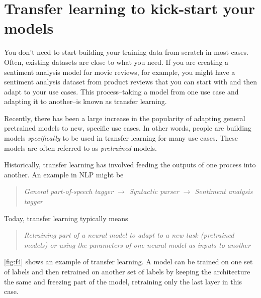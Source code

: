 \documentclass[sigconf,nonacm,screen,pbalance]{acmart}
\begin{document}
\section{Transfer learning to kick-start your models}
You
don't
need to start building your training data from scratch in most cases. Often, existing
datasets are close to what you need. If you are creating a sentiment analysis model for
movie reviews, for example, you might have a sentiment analysis dataset from product
reviews that you can start with and then adapt to your use cases. This process--taking a
model from one use case and adapting it to another--is known as transfer learning.

Recently,
there has been a large increase in the popularity of adapting general pretrained models
to new, specific use cases. In other words, people are building models
\emph{specifically} to be used in transfer learning for many use cases. These models are
often referred to as {\em pretrained} models.

Historically,
transfer learning has involved feeding the outputs of one process into another. An
example in NLP might be
\begin{quote}
{\em General part-of-speech tagger $\rightarrow$ Syntactic parser $\rightarrow$ Sentiment analysis tagger}
\end{quote}

Today, transfer learning typically means
\begin{quote}
{\em Retraining
part of a neural model to adapt to a new task (pretrained models) or using the
parameters of one neural model as inputs to another}
\end{quote}

\autoref{fig:f4} shows an example of transfer learning. A model can be trained on one set of labels
and then retrained on another set of labels by keeping the architecture the same and
freezing part of the model, retraining only the last layer in this case.
\end{document}
